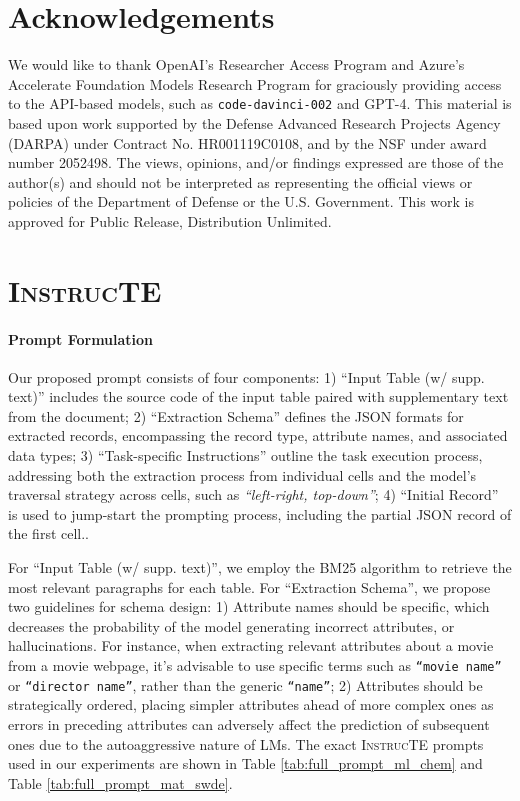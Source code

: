 \documentclass[11pt]{article}
\newcommand\method{\textsc{InstrucTE}}
\begin{document}
\section*{Acknowledgements}
We would like to thank OpenAI's Researcher Access Program and Azure's Accelerate Foundation Models Research Program for graciously providing access to the API-based models, such as \texttt{code-davinci-002} and GPT-4.
This material is based upon work supported by the Defense Advanced Research Projects Agency (DARPA) under Contract No. HR001119C0108, and by the NSF under award number 2052498.
The views, opinions, and/or findings expressed are those of the author(s) and should not be interpreted as representing the official views or policies of the Department of Defense or the U.S. Government. 
This work is approved for Public Release, Distribution Unlimited. 







\appendix
\clearpage



\section{\method{}}
\label{sec:promp_appendix}

\paragraph{Prompt Formulation}
Our proposed prompt consists of four components: 1) ``Input Table (w/ supp. text)'' includes the source code of the input table paired with supplementary text from the document;
2) ``Extraction Schema'' defines the JSON formats for extracted records, encompassing the record type, attribute names, and associated data types;
3) ``Task-specific Instructions'' outline the task execution process, addressing both the extraction process from individual cells and the model's traversal strategy across cells, such as \textit{``left-right, top-down''}; 
4) ``Initial Record'' is used to jump-start the prompting process, including the partial JSON record of the first cell..

For ``Input Table (w/ supp. text)'', we employ the BM25 algorithm to retrieve the most relevant paragraphs for each table. For ``Extraction Schema'', we propose two guidelines for schema design: 1) Attribute names should be specific, which decreases the probability of the model generating incorrect attributes, or hallucinations. For instance, when extracting relevant attributes about a movie from a movie webpage, it's advisable to use specific terms such as \texttt{``movie name''} or \texttt{``director name''}, rather than the generic \texttt{``name''}; 2) Attributes should be strategically ordered, placing simpler attributes ahead of more complex ones as errors in preceding attributes can adversely affect the prediction of subsequent ones due to the autoaggressive nature of LMs.
The exact \method{} prompts used in our experiments are shown in Table \ref{tab:full_prompt_ml_chem} and Table \ref{tab:full_prompt_mat_swde}.
\end{document}
